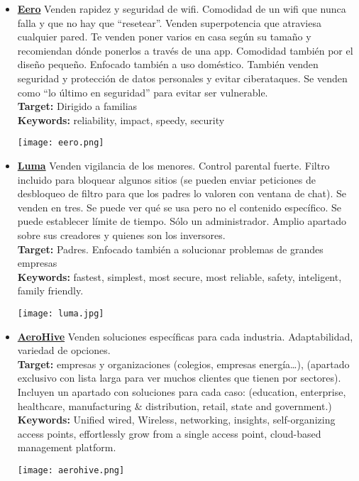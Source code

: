\begin{itemize}
	\item \href{https://www.eero.com/}{\textbf{Eero}} Venden rapidez y seguridad de wifi. Comodidad de un wifi que nunca falla y que no hay que “resetear”. Venden superpotencia que atraviesa cualquier pared. Te venden poner varios en casa según su tamaño y recomiendan dónde ponerlos a través de una app. Comodidad también por el diseño pequeño. Enfocado también a uso doméstico. También venden seguridad y protección de datos personales y evitar ciberataques. Se venden como “lo último en seguridad” para evitar ser vulnerable.\\
	\textbf{Target:} Dirigido a familias\\
	\textbf{Keywords:} reliability, impact, speedy, security\\
	\begin{center}
		\texttt{[image: eero.png]}
	\end{center}
	\newpage
	\item \href{https://getluma.com/}{\textbf{Luma}} Venden vigilancia de los menores. Control parental fuerte. Filtro incluido para bloquear algunos sitios (se pueden enviar peticiones de desbloqueo de filtro para que los padres lo valoren con ventana de chat). Se venden en tres. Se puede ver qué se usa pero no el contenido específico. Se puede establecer límite de tiempo. Sólo un administrador. Amplio apartado sobre sus creadores y quienes son los inversores.\\
		\textbf{Target:} Padres. Enfocado también a solucionar problemas de grandes empresas\\
	\textbf{Keywords:} fastest, simplest, most secure, most reliable, safety, inteligent, family friendly.\\
	\begin{center}
		\texttt{[image: luma.jpg]}
	\end{center}
	
	\item \href{http://www.aerohive.com/products/routers/br100.html}{\textbf{AeroHive}} Venden soluciones específicas para cada industria. Adaptabilidad, variedad de opciones.\\
	\textbf{Target:} empresas y organizaciones (colegios, empresas energía…), (apartado exclusivo con lista larga para ver muchos clientes que tienen por sectores). Incluyen un apartado con soluciones para cada caso: (education, enterprise, healthcare, manufacturing \& distribution, retail, state and government.)\\
	\textbf{Keywords:} Unified wired, Wireless, networking, insights, self-organizing access points, effortlessly grow from a single access point, cloud-based management platform.\\
	\begin{center}
		\texttt{[image: aerohive.png]}
	\end{center}
	

\end{itemize}
